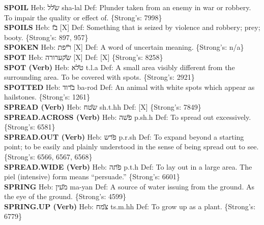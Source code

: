 {\textbf{SPOIL} Heb: {\large\H שלל} sha-lal Def: Plunder taken from an enemy in war or robbery. To impair the quality or effect of. \{Strong's: 7998\}\hfill{}\\

\textbf{SPOILS} Heb: {\large\H בז} {[}X{]} Def: Something that is seized by violence and robbery; prey; booty. \{Strong's: 897, 957\}\hfill{}\\

\textbf{SPOKEN} Heb: {\large\H ריפת} {[}X{]} Def: A word of uncertain meaning. \{Strong's: n/a\}\hfill{}\\

\textbf{SPOT} Heb: {\large\H שקערורה} {[}X{]} Def: {[}X{]} \{Strong's: 8258\}\hfill{}\\

\textbf{SPOT (Verb)} Heb: {\large\H טלא} t.l.a Def: A small area visibly different from the surrounding area. To be covered with spots. \{Strong's: 2921\}\hfill{}\\

\textbf{SPOTTED} Heb: {\large\H ברוד} ba-rod Def: An animal with white spots which appear as hailstones. \{Strong's: 1261\}\hfill{}\\

\textbf{SPREAD (Verb)} Heb: {\large\H שטח} sh.t.hh Def: {[}X{]} \{Strong's: 7849\}\hfill{}\\

\textbf{SPREAD.ACROSS (Verb)} Heb: {\large\H פשה} p.sh.h Def: To spread out excessively. \{Strong's: 6581\}\hfill{}\\

\textbf{SPREAD.OUT (Verb)} Heb: {\large\H פרש} p.r.sh Def: To expand beyond a starting point; to be easily and plainly understood in the sense of being spread out to see. \{Strong's: 6566, 6567, 6568\}\hfill{}\\

\textbf{SPREAD.WIDE (Verb)} Heb: {\large\H פתה} p.t.h Def: To lay out in a large area. The piel (intensive) form means ``persuade.'' \{Strong's: 6601\}\hfill{}\\

\textbf{SPRING} Heb: {\large\H מעין} ma-yan Def: A source of water issuing from the ground. As the eye of the ground. \{Strong's: 4599\}\hfill{}\\

\textbf{SPRING.UP (Verb)} Heb: {\large\H צמח} ts.m.hh Def: To grow up as a plant. \{Strong's: 6779\}\hfill{}\\

}
